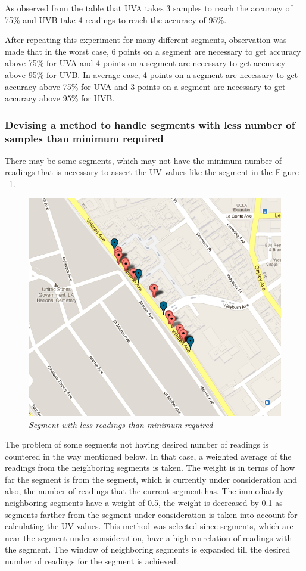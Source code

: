\documentclass[12pt,fullpage,doublespace]{article}
\begin{document}
As observed from the table that UVA takes 3 samples to reach the accuracy of 75\% and UVB take 4 readings to reach the accuracy of 95\%. 
\newpage


\newpage
After repeating this experiment for many different segments, observation was made that in the worst case, 6 points on a segment are necessary to get accuracy above 75\% for UVA and 4 points on a segment are necessary to get accuracy above 95\% for UVB.
In average case, 4 points on a segment are necessary to get accuracy above 75\% for UVA and  3 points on a segment are necessary to get accuracy above 95\% for UVB.


\subsubsection{Devising a method to handle segments with less number of samples than minimum required}
There may be some segments, which may not have the minimum number of readings that is necessary to assert the UV values like the segment in the Figure ~\ref{fig:lessReadings}. 
\begin{figure}
\begin{center}
\includegraphics[scale=0.35]{lessReadings.png}
\caption{\small \sl Segment with less readings than minimum required}
\label{fig:lessReadings}
\end{center}
\end{figure}
The problem of some segments not having desired number of readings is countered in the way mentioned below. In that case, a weighted average of the readings from the neighboring segments is taken. The weight is in terms of how far the segment is from the segment, which is currently under consideration and also, the number of readings that the current segment has. The immediately neighboring segments have a weight of 0.5, the weight is decreased by 0.1 as segments farther from the segment under consideration is taken into account for calculating the UV values. This method was selected since segments, which are near the segment under consideration, have a high correlation of readings with the segment. The window of neighboring segments is expanded till the desired number of readings for the segment is achieved. 
\end{document}
